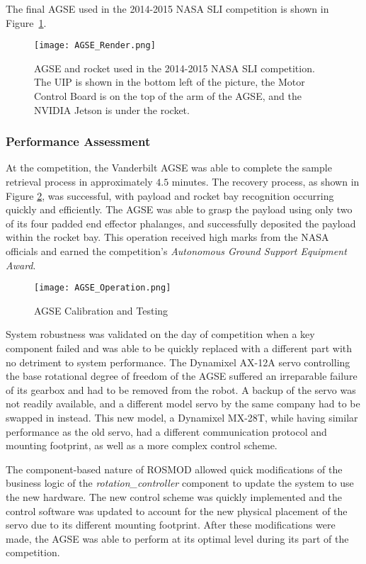 The final AGSE used in the 2014-2015 NASA SLI competition is shown in
Figure~\ref{fig:competition_AGSE}.

\begin{figure}[h]
	\centering
	\texttt{[image: AGSE\_Render.png]}
	\caption{AGSE and rocket used in the 2014-2015 NASA SLI
		competition.  The UIP is shown in the bottom left of the
		picture, the Motor Control Board is on the top of the arm of
		the AGSE, and the NVIDIA Jetson is under the rocket.}
	\label{fig:competition_AGSE}
\end{figure}
\FloatBarrier

\subsubsection{Performance Assessment}

At the competition, the Vanderbilt AGSE was able to complete the
sample retrieval process in approximately $4.5$ minutes. The recovery
process, as shown in Figure \ref{fig:AGSE_Operation}, was successful,
with payload and rocket bay recognition occurring quickly and
efficiently. The AGSE was able to grasp the payload using only two of
its four padded end effector phalanges, and successfully deposited the
payload within the rocket bay. This operation received high marks from
the NASA officials and earned the competition's \emph{Autonomous
	Ground Support Equipment Award}.

\begin{figure}[t]
	\centering
	\texttt{[image: AGSE\_Operation.png]}
	\caption{AGSE Calibration and Testing}
	\label{fig:AGSE_Operation}	
\end{figure}
\FloatBarrier

System robustness was validated on the day of competition when a key
component failed and was able to be quickly replaced with a different
part with no detriment to system performance. The Dynamixel AX-12A
servo controlling the base rotational degree of freedom of the AGSE
suffered an irreparable failure of its gearbox and had to be removed
from the robot. A backup of the servo was not readily available, and a
different model servo by the same company had to be swapped in
instead.  This new model, a Dynamixel MX-28T, while having similar
performance as the old servo, had a different communication protocol
and mounting footprint, as well as a more complex control scheme.

The component-based nature of ROSMOD allowed quick modifications of
the business logic of the \emph{rotation\_controller} component to
update the system to use the new hardware.  The new control scheme was
quickly implemented and the control software was updated to account
for the new physical placement of the servo due to its different
mounting footprint. After these modifications were made, the AGSE was
able to perform at its optimal level during its part of the
competition.


